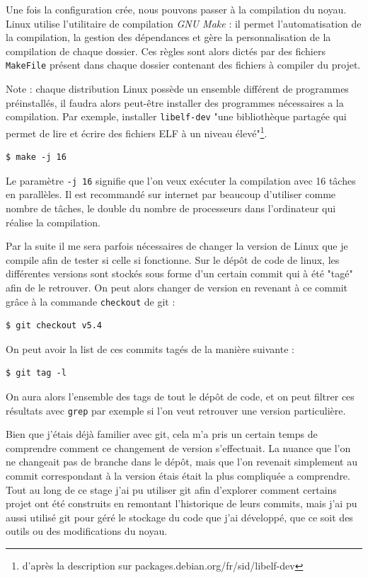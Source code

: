 Une fois la configuration crée, nous pouvons passer à la compilation du noyau. Linux utilise l'utilitaire de compilation \textit{GNU Make} : il permet l'automatisation de la compilation, la gestion des dépendances et gère la personnalisation de la compilation de chaque dossier. Ces règles sont alors dictés par des fichiers \texttt{MakeFile} présent dans chaque dossier contenant des fichiers à compiler du projet.

Note : chaque distribution Linux possède un ensemble différent de programmes préinstallés, il faudra alors peut-être installer des programmes nécessaires a la compilation. Par exemple, installer \texttt{libelf-dev} "une bibliothèque partagée qui permet de lire et écrire des fichiers ELF à un niveau élevé"\footnote{d'après la description sur packages.debian.org/fr/sid/libelf-dev}. 

\begin{lstlisting}[style=command, caption=Compilation sur plusieurs processeurs] 
$ make -j 16
\end{lstlisting}

Le paramètre \texttt{-j 16} signifie que l'on veux exécuter la compilation avec 16 tâches en parallèles. Il est recommandé sur internet par beaucoup d'utiliser comme nombre de tâches, le double du nombre de processeurs dans l'ordinateur qui réalise la compilation.

Par la suite il me sera parfois nécessaires de changer la version de Linux que je compile afin de tester si celle si fonctionne. Sur le dépôt de code de linux, les différentes versions sont stockés sous forme d'un certain commit qui à été "tagé" afin de le retrouver. On peut alors changer de version en revenant à ce commit grâce à la commande \texttt{checkout} de \gls{git} : 
\begin{lstlisting}[style=command, caption=Retour sur un commit tagé]
$ git checkout v5.4
\end{lstlisting}
On peut avoir la list de ces commits tagés de la manière suivante : 
\begin{lstlisting}[style=command, caption=Comment lister les tags]
$ git tag -l
\end{lstlisting}
On aura alors l'ensemble des tags de tout le dépôt de code, et on peut filtrer ces résultats avec \texttt{grep} par exemple si l'on veut retrouver une version particulière.

Bien que j'étais déjà familier avec git, cela m'a pris un certain temps de comprendre comment ce changement de version s'effectuait. La nuance que l'on ne changeait pas de branche dans le dépôt, mais que l'on revenait simplement au commit correspondant à la version étais était la plus compliquée a comprendre. Tout au long de ce stage j'ai pu utiliser \gls{git} afin d'explorer comment certains projet ont été construits en remontant l'historique de leurs commits, mais j'ai pu aussi utilisé \gls{git} pour géré le stockage du code que j'ai développé, que ce soit des outils ou des modifications du noyau.  


